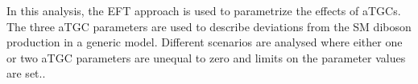 \noindent In this analysis, the EFT approach is used to parametrize the effects of aTGCs. The three aTGC parameters are used to describe deviations from the SM diboson production in a generic model. Different scenarios are analysed where either one or two aTGC parameters are unequal to zero and limits on the parameter values are set..
